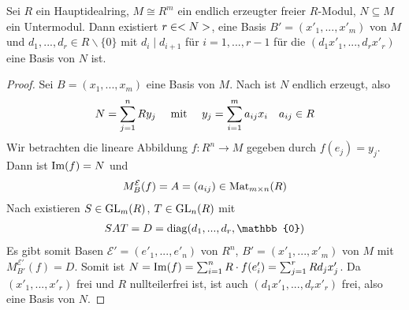 \begin{proposition}
	Sei $R$ ein Hauptidealring, $M\cong R^m$ ein endlich erzeugter freier $R$-Modul, $N\subseteq M$ ein Untermodul. Dann existiert $r\in<N>$, eine Basis $B'=(x'_1,...,x'_m)$ von $M$ und $d_1,...,d_r\in R\backslash\{0\}$ mit $d_i\mid d_{i+1}$ für $i=1,...,r-1$ für die $(d_1x'_1,...,d_rx'_r)$ eine Basis von $N$ ist.
\end{proposition}
\begin{proof}
	Sei $B=(x_1,...,x_m)$ eine Basis von $M$. Nach  ist $N$ endlich erzeugt, also 
	\begin{align}
		N=\sum_{j=1}^n Ry_j\quad\text{ mit }\quad y_j=\sum_{i=1}^m a_{ij}x_i\quad a_{ij}\in R\notag
	\end{align}
	Wir betrachten die lineare Abbildung $f:R^n\to M$ gegeben durch $f(e_j)=y_j$. Dann ist $\operatorname{Im}(f)=N$ und 
	\begin{align}
		M_B^{\mathcal{E}}(f)=A=(a_{ij})\in\operatorname{Mat}_{m\times n}(R)\notag
	\end{align}
	Nach  existieren $S\in\operatorname{GL}_m(R)$, $T\in\operatorname{GL}_n(R)$ mit
	\begin{align}
		SAT=D=\diag(d_1,...,d_r,\mathbb{0})\notag
	\end{align}
	Es gibt somit Basen $\mathcal{E}'=(e'_1,...,e'_n)$ von $R^n$, $B'=(x'_1,...,x'_m)$ von $M$ mit $M_{B'}^{\mathcal{E}'}(f)=D$. Somit ist $N=\operatorname{Im}(f)=\sum_{i=1}^n R\cdot f(e'_i)=\sum_{j=1}^r Rd_jx'_j$. Da $(x'_1,...,x'_r)$ frei und $R$ nullteilerfrei ist, ist auch $(d_1x'_1,...,d_rx'_r)$ frei, also eine Basis von $N$.
\end{proof}


